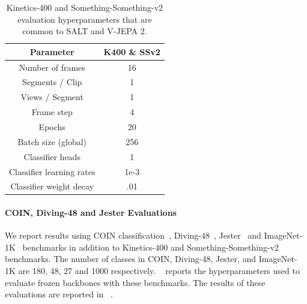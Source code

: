 \documentclass{applemlr}
\numberwithin{equation}{section}
\newcommand{\ourmethod}{SALT\xspace}
\begin{document}
\begin{table}[htbp]
\centering
\caption{Kinetics-400 and Something-Something-v2 evaluation hyperparameters that are common to \ourmethod and V-JEPA 2.}
\label{tab:appendix:eval:hparams:16x1x1}
\begin{tabular}{cc}
\toprule
Parameter & K400 \& SSv2 \\ 
\midrule
Number of frames & 16 \\ 
Segments / Clip & 1  \\ 
Views / Segment & 1  \\ 
Frame step & 4  \\ 
Epochs & 20  \\ 
Batch size (global) & 256  \\ 
Classifier heads & 1   \\ 
Classifier learning rates & 1e-3  \\ 
Classifier weight decay & .01  \\ 
\bottomrule
\end{tabular}
\end{table}

\paragraph{COIN, Diving-48 and Jester Evaluations} We report results using COIN classification~\citep{tang2019coin}, Diving-48~\citep{diving48_Li_2018_ECCV}, Jester~\citep{jester_materzynska2019} and ImageNet-1K~\citep{imagenet_russakovsky2015} benchmarks in addition to Kinetics-400 and Something-Something-v2 benchmarks. The number of classes in COIN, Diving-48, Jester, and ImageNet-1K are 180, 48, 27 and 1000 respectively.
~ reports the hyperparameters used to evaluate frozen backbones with these benchmarks. The results of these evaluations are reported in ~.
\end{document}
